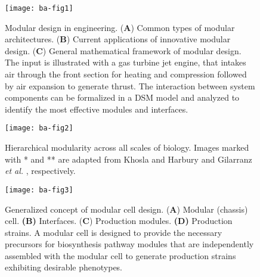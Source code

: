 %

\begin{figure}[h]
  \centering
  \texttt{[image: ba-fig1]}
    \caption[Modular design in engineering]{Modular design in engineering. (\textbf{A}) Common
types of modular architectures. (\textbf{B}) Current applications of
innovative modular design. (\textbf{C}) General mathematical framework
of modular design. The input is illustrated with a gas turbine jet
engine, that intakes air through the front section for heating and
compression followed by air expansion to generate thrust. The
interaction between system components can be formalized in a DSM model
    and analyzed to identify the most effective modules and interfaces.}
    \label{fig:ba-fig1}
\end{figure}

\begin{figure}[h]
  \centering
  \texttt{[image: ba-fig2]}
    \caption[Hierarchical modularity across all scales of biology]{Hierarchical modularity across all scales of biology.
Images marked with * and ** are adapted from Khosla and Harbury
\citep{khosla2001} and Gilarranz \emph{et al.}
    \citep{gilarranz2017}, respectively.}
    \label{fig:ba-fig2}
\end{figure}

\begin{figure}[h]
  \centering
  \texttt{[image: ba-fig3]}
    \caption[Generalized concept of modular cell design]{Generalized concept of modular cell design.
    (\textbf{A}) Modular (chassis) cell. \textbf{(B)} Interfaces.
(\textbf{C}) Production modules. \textbf{(D)} Production strains. A
modular cell is designed to provide the necessary precursors for
biosynthesis pathway modules that are independently assembled with the
modular cell to generate production strains exhibiting desirable
phenotypes.}
    \label{fig:ba-fig3}
\end{figure}

